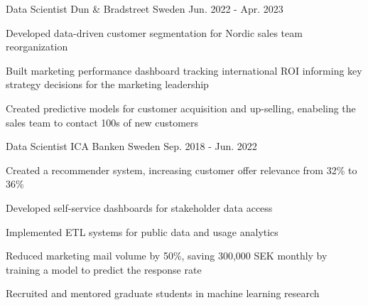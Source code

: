 \begin{cventries}
  \cventry
    {Data Scientist} %
    {Dun \& Bradstreet} %
    {Sweden} %
    {Jun. 2022 - Apr. 2023} %
    {
      \begin{cvitems} %
        \item {Developed data-driven customer segmentation for Nordic sales team reorganization}
        \item {Built marketing performance dashboard tracking international ROI informing key strategy decisions for the marketing leadership}
        \item {Created predictive models for customer acquisition and up-selling, enabeling the sales team to contact 100s of new customers}
      \end{cvitems}
    }

  \cventry
    {Data Scientist} %
    {ICA Banken} %
    {Sweden} %
    {Sep. 2018 - Jun. 2022} %
    {
      \begin{cvitems} %
        \item {Created a recommender system, increasing customer offer relevance from 32\% to 36\%}
        \item {Developed self-service dashboards for stakeholder data access}
        \item {Implemented ETL systems for public data and usage analytics}
        \item {Reduced marketing mail volume by 50\%, saving 300,000 SEK monthly by training a model to predict the response rate}
        \item {Recruited and mentored graduate students in machine learning research}
      \end{cvitems}
    }

\end{cventries}
